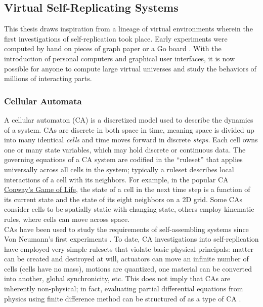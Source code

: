 {%
\subsection{Virtual Self-Replicating Systems}

This thesis draws inspiration from a lineage of virtual environments wherein the first investigations of self-replication took place.  Early experiments were computed by hand on pieces of graph paper or a Go board \cite{Gardner1970}.  With the introduction of personal computers and graphical user interfaces, it is now possible for anyone to compute large virtual universes and study the behaviors of millions of interacting parts.

\subsubsection{Cellular Automata}

A cellular automaton (CA) is a discretized model used to describe the dynamics of a system.  CAs are discrete in both space in time, meaning space is divided up into many identical \textit{cells} and time moves forward in discrete \textit{steps}.  Each cell owns one or many state variables, which may hold discrete or continuous data.  The governing equations of a CA system are codified in the ``ruleset'' that applies universally across all cells in the system; typically a ruleset describes local interactions of a cell with its neighbors.  For example, in the popular CA \href{https://en.wikipedia.org/wiki/Conway's_Game_of_Life}{Conway's Game of Life}, the state of a cell in the next time step is a function of its current state and the state of its eight neighbors on a 2D grid.  Some CAs consider cells to be spatially static with changing state, others employ kinematic rules, where cells can move across space.\\

CAs have been used to study the requirements of self-assembling systems since Von Neumann's first experiments \cite{Neumann1966}.  To date, CA investigations into self-replication have employed very simple rulesets that violate basic physical principals: matter can be created and destroyed at will, actuators can move an infinite number of cells (cells have no mass), motions are quantized, one material can be converted into another, global synchronicity, etc.  This does not imply that CAs are inherently non-physical; in fact, evaluating partial differential equations from physics using finite difference method can be structured of as a type of CA \cite{Yang2010}.

}

